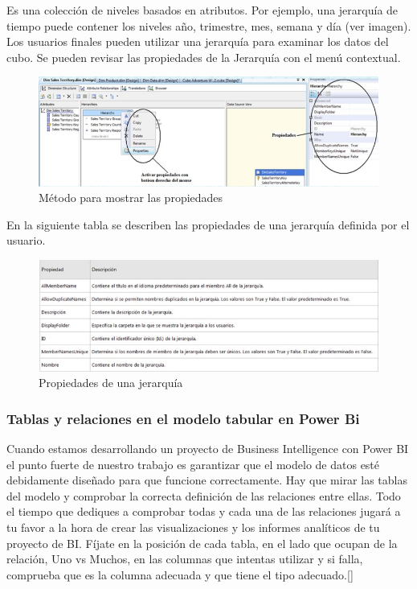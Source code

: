 \documentclass[11pt,a4paper]{article}
\begin{document}
			Es una colección de niveles basados en atributos. Por ejemplo, una jerarquía de tiempo puede contener los niveles año, trimestre, mes, semana y día (ver imagen). Los usuarios finales pueden utilizar una jerarquía para examinar los datos del cubo. Se pueden revisar las propiedades de la Jerarquía con el menú contextual.			
				\begin{figure}[H]
					\begin{center}
						\includegraphics[scale=0.75]{./IMAGENES/img03}	
						\caption{Método para mostrar las propiedades}	
					\end{center}
				\end{figure}
			\newpage
			En la siguiente tabla se describen las propiedades de una jerarquía definida por el usuario.			
				\begin{figure}[H]
					\begin{center}
						\includegraphics[scale=0.75]{./IMAGENES/img04}	
						\caption{Propiedades de una jerarquía }		
					\end{center}
				\end{figure}
			
			\subsubsection{Tablas y relaciones en el modelo tabular en Power Bi}
			
			Cuando estamos desarrollando un proyecto de Business Intelligence con Power BI el punto fuerte de nuestro trabajo es garantizar que el modelo de datos esté debidamente diseñado para que funcione correctamente. Hay que mirar las tablas del modelo y comprobar la correcta definición de las relaciones entre ellas.
			Todo el tiempo que dediques a comprobar todas y cada una de las relaciones jugará a tu favor a la hora de crear las visualizaciones y los informes analíticos de tu proyecto de BI. Fíjate en la posición de cada tabla, en el lado que ocupan de la relación, Uno vs Muchos, en las columnas que intentas utilizar y si falla, comprueba que es la columna adecuada y que tiene el tipo adecuado.[\cite{cuevas2016comparing}]
			
\end{document}
